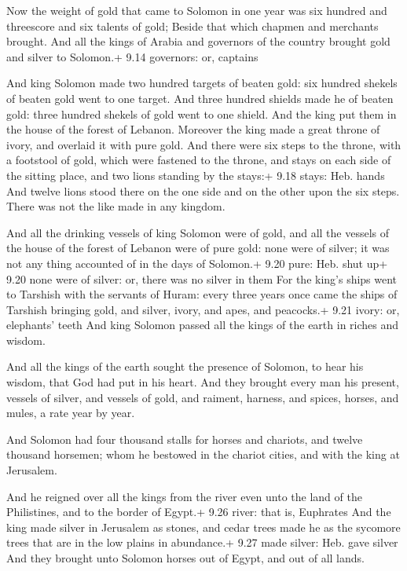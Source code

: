  Now the weight of gold that came to Solomon in one year
was six hundred and threescore and six talents of gold; 
Beside that which chapmen and merchants brought. And all the kings of
Arabia and governors of the country brought gold and silver to Solomon.+
9.14 governors: or, captains

 And king Solomon made two hundred targets of beaten
gold: six hundred shekels of beaten gold went to one target.
 And three hundred shields made he of beaten gold: three
hundred shekels of gold went to one shield. And the king put them in the
house of the forest of Lebanon.  Moreover the king made a
great throne of ivory, and overlaid it with pure gold.  And
there were six steps to the throne, with a footstool of gold, which were
fastened to the throne, and stays on each side of the sitting place, and
two lions standing by the stays:+ 9.18 stays: Heb. hands 
And twelve lions stood there on the one side and on the other upon the
six steps. There was not the like made in any kingdom.

 And all the drinking vessels of king Solomon were of
gold, and all the vessels of the house of the forest of Lebanon were of
pure gold: none were of silver; it was not any thing accounted of in the
days of Solomon.+ 9.20 pure: Heb. shut up+ 9.20 none were of silver: or,
there was no silver in them  For the king's ships went to
Tarshish with the servants of Huram: every three years once came the
ships of Tarshish bringing gold, and silver, ivory, and apes, and
peacocks.+ 9.21 ivory: or, elephants' teeth  And king
Solomon passed all the kings of the earth in riches and wisdom.

 And all the kings of the earth sought the presence of
Solomon, to hear his wisdom, that God had put in his heart.
 And they brought every man his present, vessels of silver,
and vessels of gold, and raiment, harness, and spices, horses, and
mules, a rate year by year.

 And Solomon had four thousand stalls for horses and
chariots, and twelve thousand horsemen; whom he bestowed in the chariot
cities, and with the king at Jerusalem.

 And he reigned over all the kings from the river even
unto the land of the Philistines, and to the border of Egypt.+ 9.26
river: that is, Euphrates  And the king made silver in
Jerusalem as stones, and cedar trees made he as the sycomore trees that
are in the low plains in abundance.+ 9.27 made silver: Heb. gave silver
 And they brought unto Solomon horses out of Egypt, and out
of all lands.

